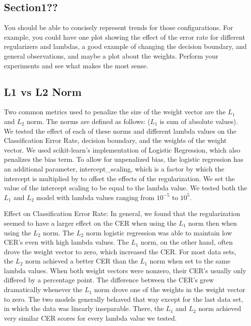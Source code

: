 \documentclass[10pt,twoside]{article}
\begin{document}
\subsection{Section1??}


You should be able to concisely represent trends for those configurations. For example, you could have one plot showing the effect of the error rate for different regularizers and lambdas, a good example of changing the decision boundary, and general observations, and maybe a plot about the weights. Perform your experiments and see what makes the most sense.

\subsection{L1 vs L2 Norm}

Two common metrics used to penalize the size of the weight vector are the $L_1$ and $L_2$ norm. The norms are defined as follows: ($L_1$ is sum of absolute values). We tested the effect of each of these norms and different lambda values on the Classification Error Rate, decision boundary, and the weights of the weight vector. We used scikit-learn's implementation of Logistic Regression, which also penalizes the bias term. To allow for unpenalized bias, the logistic regression has an additional parameter, intercept_scaling, which is a factor by which the intercept is multiplied by to offset the effects of the regularization. We set the value of the intercept scaling to be equal to the lambda value. We tested both the $L_1$ and $L_2$ model with lambda values ranging from $10^{-5}$ to $10^5$. 

Effect on Classification Error Rate:
In general, we found that the regularization seemed to have a larger effect on the CER when using the $L_1$ norm then when using the $L_2$ norm. The $L_2$ norm logistic regression was able to maintain low CER's even with high lambda values. The $L_1$ norm, on the other hand, often drove the weight vector to zero, which increased the CER. For most data sets, the $L_2$ norm achieved a better CER than the $L_1$ norm when set to the same lambda values. When both weight vectors were nonzero, their CER's usually only differed by a percentage point. The difference between the CER's grew dramatically whenever the $L_1$ norm drove one of the weights in the weight vector to zero. The two models generally behaved that way except for the last data set, in which the data was linearly inseparable. There, the $L_1$ and $L_2$ norm achieved very similar CER scores for every lambda value we tested. 
\end{document}
